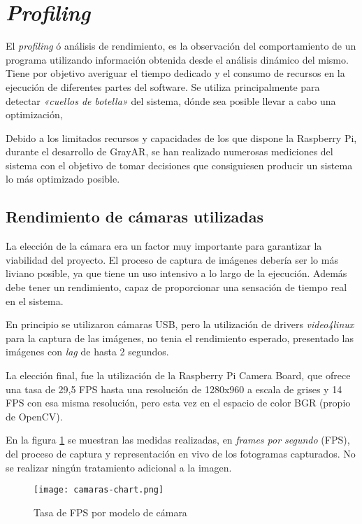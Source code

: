 \section{\textit{Profiling}}

El \textit{profiling} ó análisis de rendimiento, es la observación del comportamiento de un programa utilizando información obtenida desde el análisis dinámico del mismo. Tiene por objetivo averiguar el tiempo dedicado y el consumo de recursos en la ejecución de diferentes partes del software. Se utiliza principalmente para detectar \textit{«cuellos de botella»} del sistema, dónde sea posible llevar a cabo una optimización,

Debido a los limitados recursos y capacidades de los que dispone la Raspberry Pi, durante el desarrollo de GrayAR, se han realizado numerosas mediciones del sistema con el objetivo de tomar decisiones que consiguiesen producir un sistema lo más optimizado posible.

\subsection{Rendimiento de cámaras utilizadas}
La elección de la cámara era un factor muy importante para garantizar la viabilidad del proyecto. El proceso de captura de imágenes debería ser lo más liviano posible, ya que tiene un uso intensivo a lo largo de la ejecución. Además debe tener un rendimiento, capaz de proporcionar una sensación de tiempo real en el sistema. 

En principio se utilizaron cámaras USB, pero la utilización de drivers \textit{video4linux} para la captura de las imágenes, no tenia el rendimiento esperado, presentado las imágenes con \textit{lag} de hasta 2 segundos.

La elección final, fue la utilización de la Raspberry Pi Camera Board, que ofrece una tasa de 29,5 FPS hasta una resolución de 1280x960 a escala de grises y 14 FPS con esa misma resolución, pero esta vez en el espacio de color BGR (propio de OpenCV).

En la figura \ref{fig:camaras_chart} se muestran las medidas realizadas, en \textit{frames por segundo} (FPS), del proceso de captura y representación en vivo de los fotogramas capturados. No se realizar ningún tratamiento adicional a la imagen.

\begin{figure}
  \begin{center}
    \texttt{[image: camaras-chart.png]}
    \caption{Tasa de FPS por modelo de cámara}
    \label{fig:camaras_chart}
  \end{center}
\end{figure}

